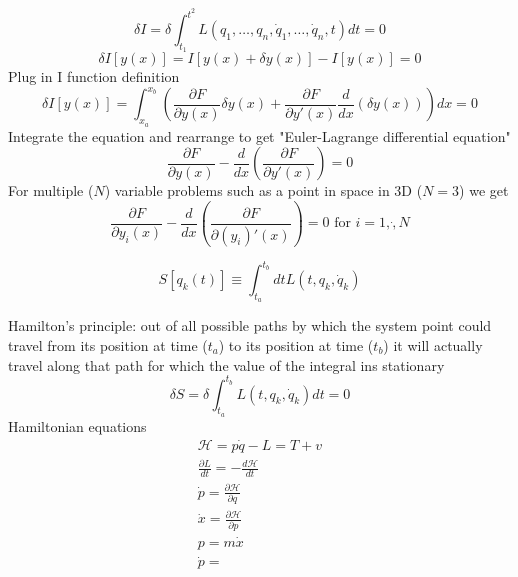 \documentclass[12pt]{article}
\begin{document}
    \begin{equation}
        \delta I = \delta \int_{t_1}^{t^2} L(q_1, \dots, q_n, \dot{q}_1, \dots, \dot{q}_n, t) dt = 0
    \end{equation}
    \begin{equation}
        \delta I[y(x)] = I[y(x) + \delta y(x)] - I[y(x)] = 0
    \end{equation}
    Plug in I function definition
    \begin{equation}
        \delta I[y(x)] = \int_{x_a}^{x_b} \left( \frac{\partial F}{\partial y(x)} \delta y(x) + \frac{\partial F}{\partial y'(x)} \frac{d}{dx} (\delta y(x)) \right) dx = 0
    \end{equation}
    Integrate the equation and rearrange to get "Euler-Lagrange differential equation"
    \begin{equation} \label{eq: Euler}
        \boxed{\frac{\partial F}{\partial y(x)} - \frac{d}{dx} \left( \frac{\partial F}{\partial y'(x)} \right) = 0}
    \end{equation}
    For multiple ($N$) variable problems such as a point in space in 3D ($N=3$) we get 
    \begin{equation}
        \boxed{\frac{\partial F}{\partial y_i(x)} - \frac{d}{dx} \left( \frac{\partial F}{\partial (y_i)'(x)} \right) = 0} \text{ for } i = 1,\dot,N
    \end{equation}

    \begin{equation}
        S[q_k(t)] \equiv \int_{t_a}^{t_b} dt L(t,q_k,\dot{q}_k)
    \end{equation}

    Hamilton's principle: out of all possible paths by which the system point could travel from its position at time ($t_a$) to its position at time ($t_b$) it will actually travel along that path for which the value of the integral ins stationary
    \begin{equation}
        \delta S = \delta \int_{t_a}^{t_b} L(t,q_k,\dot{q}_k) dt = 0
    \end{equation}
    Hamiltonian equations
    \begin{gather*}
        \mathcal{H} = p \dot{q} - L = T + v
        \\ \frac{\partial L}{dt} = - \frac{d \mathcal{H}}{dt}
        \\ \dot{p} = \frac{\partial \mathcal{H}}{\partial q}
        \\ \dot{x} = \frac{\partial \mathcal{H}}{\partial p}
        \\ p = m \dot{x}
        \\ \dot{p} = 
    \end{gather*}
\end{document}
